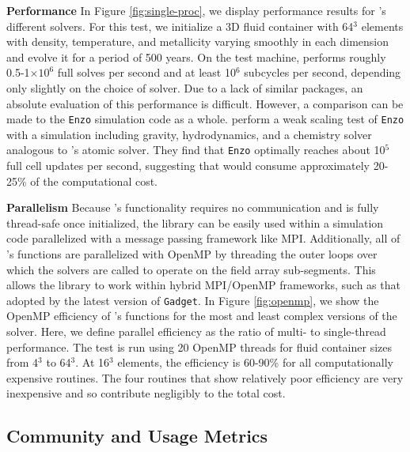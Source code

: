 \noindent
{\bf Performance}
In Figure \ref{fig:single-proc}, we
display performance results for \grackle{}'s different solvers.  For
this test, we initialize a 3D fluid container with 64$^{3}$ elements
with density, temperature, and metallicity varying smoothly in each
dimension and evolve it for a period of 500 years.  On the test
machine, \grackle{} performs
roughly 0.5-1$\times10^{6}$ full solves per second and at least
10$^{6}$ subcycles per second, depending only slightly on the choice
of solver.  Due to a lack of similar packages, an absolute evaluation
of this performance is difficult.  However, a comparison can be made
to the \texttt{Enzo} simulation code as a whole.
\citet{2014ApJS..211...19B} perform a weak scaling test of
\texttt{Enzo} with a simulation including gravity,
hydrodynamics, and a chemistry solver analogous to \grackle{}'s atomic
solver.  They find that \texttt{Enzo} optimally reaches about 10$^{5}$
full cell updates per second, suggesting that \grackle{} would consume
approximately 20-25\% of the computational cost.

\noindent
{\bf Parallelism}
Because \grackle{}'s functionality requires no communication and is
fully thread-safe once initialized, the library can be easily used
within a simulation code parallelized with a message passing framework
like MPI.  Additionally, all of \grackle{}'s functions are
parallelized with OpenMP by threading the outer loops over which the
solvers are called to operate on the field array sub-segments.  This
allows the library to work within hybrid MPI/OpenMP frameworks, such
as that adopted by the latest version of \texttt{Gadget}.
In Figure \ref{fig:openmp}, we show the OpenMP efficiency of
\grackle{}'s functions for the most and least complex versions
of the solver.  Here, we define parallel efficiency as the ratio of
multi- to single-thread performance.  The test is run using 20 OpenMP
threads for fluid container sizes from 4$^{3}$ to
64$^{3}$.  At 16$^{3}$ elements, the efficiency is 60-90\%
for all computationally expensive routines.  The four routines that
show relatively poor efficiency are very inexpensive and so contribute negligibly to
the total cost.

\subsection{Community and Usage Metrics}

